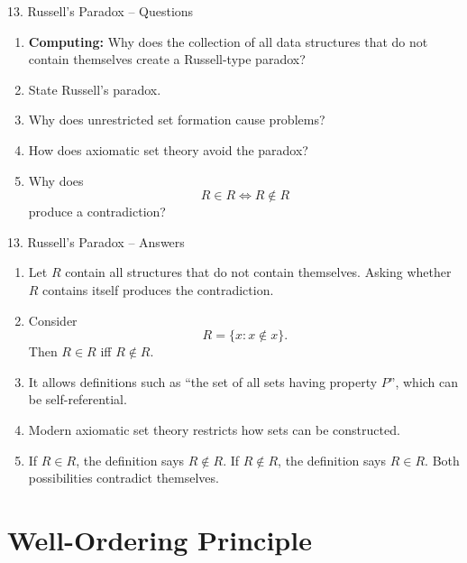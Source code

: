 \documentclass[aspectratio=169,11pt]{beamer}
\begin{document}
\begin{frame}{13. Russell's Paradox -- Questions}

\begin{enumerate}
\item \textbf{Computing:} Why does the collection of all data structures that do not contain themselves create a Russell-type paradox?

\item State Russell's paradox.

\item Why does unrestricted set formation cause problems?

\item How does axiomatic set theory avoid the paradox?

\item Why does
\[
R\in R\iff R\notin R
\]
produce a contradiction?
\end{enumerate}

\end{frame}

\begin{frame}{13. Russell's Paradox -- Answers}

\begin{enumerate}
\item Let $R$ contain all structures that do not contain themselves. Asking whether $R$ contains itself produces the contradiction.

\item Consider
\[
R=\{x:x\notin x\}.
\]
Then $R\in R$ iff $R\notin R$.

\item It allows definitions such as ``the set of all sets having property $P$'', which can be self-referential.

\item Modern axiomatic set theory restricts how sets can be constructed.

\item If $R\in R$, the definition says $R\notin R$. If $R\notin R$, the definition says $R\in R$. Both possibilities contradict themselves.
\end{enumerate}

\end{frame}


\section{Well-Ordering Principle}
\end{document}
